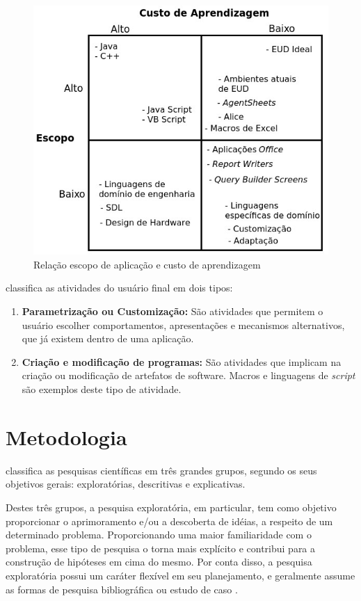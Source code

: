 \begin{figure}[h]
	\centering
	\label{fig01}
		\includegraphics[scale=0.8]{figuras/trade_off_eud_editado}
	\caption{Relação escopo de aplicação e custo de aprendizagem}
\end{figure}
\pagebreak

 classifica as atividades do usuário final em dois tipos:

\begin{enumerate}
\item \textbf{Parametrização ou Customização:} São atividades que permitem o usuário escolher comportamentos, apresentações e mecanismos  alternativos, que já existem dentro de uma aplicação.

\item \textbf{Criação e modificação de programas:} São atividades que implicam na criação ou modificação de artefatos de software. Macros e linguagens de \textit{script} são exemplos deste tipo de atividade.
\end{enumerate}


\chapter[Metodologia]{Metodologia}

 classifica as pesquisas científicas em três grandes grupos, segundo os seus objetivos gerais: exploratórias, descritivas e explicativas.

Destes três grupos, a pesquisa exploratória, em particular, tem como objetivo proporcionar o aprimoramento e/ou a descoberta de idéias, a respeito de um determinado problema. Proporcionando uma maior familiaridade com o problema, esse tipo de pesquisa o torna mais explícito e contribui para a construção de hipóteses em cima do mesmo. Por conta disso, a pesquisa exploratória possui um caráter flexível em seu planejamento, e geralmente assume as formas de pesquisa bibliográfica ou estudo de caso \cite{gil2002}.

